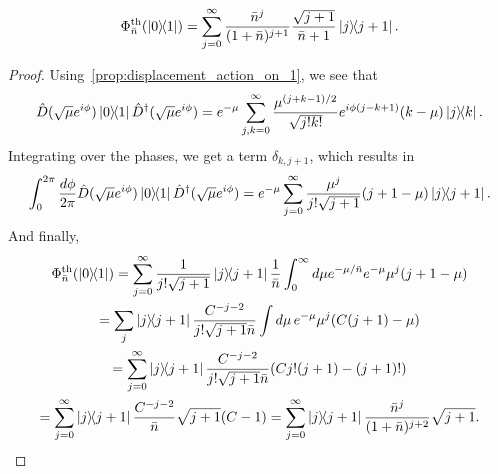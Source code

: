 \documentclass[12pt]{report}
\begin{document}
\begin{prop}\label{prop:thermalisation_applied_to_01}
	\begin{equation}
		\Phi^{\rm th}_{\bar n}(\ketbra{0}{1})
		= \sum_{j=0}^\infty
		\frac{\bar n^{j}}{(1+\bar n)^{j+1}}
		\frac{\sqrt{j+1}}{\bar n + 1}
		\ketbra{j}{j+1}.
	\end{equation}
\end{prop}

\begin{proof}
	Using~\cref{prop:displacement_action_on_1}, we see that
	\begin{equation}
		\hat D(\sqrt\mu e^{i\phi})\ketbra{0}{1} \hat D^\dagger(\sqrt\mu e^{i\phi})
		= e^{-\mu} \sum_{j,k=0}^\infty
		\frac{\mu^{(j+k-1)/2}}{\sqrt{j!k!}}
		e^{i\phi(j-k+1)} (k-\mu) \ketbra{j}{k}.
	\end{equation}
	Integrating over the phases, we get a term $\delta_{k,j+1}$, which results in
	\begin{equation}
		\int_0^{2\pi} \frac{d\phi}{2\pi}
		\hat D(\sqrt\mu e^{i\phi})\ketbra{0}{1} \hat D^\dagger(\sqrt\mu e^{i\phi})
		= e^{-\mu} \sum_{j=0}^\infty
		\frac{\mu^j}{j!\sqrt{j+1}} (j+1-\mu) \ketbra{j}{j+1}.
	\end{equation}
	And finally,
	\begin{equation}
	\begin{gathered}
		\Phi^{\rm th}_{\bar n}(\ketbra{0}{1})
		= \sum_{j=0}^\infty \frac{1}{j!\sqrt{j+1}} \ketbra{j}{j+1} \frac{1}{\bar n}
		\int_0^\infty d\mu
		e^{-\mu/\bar n} e^{-\mu} \mu^j (j+1-\mu) \\
		= \sum_j \ketbra{j}{j+1} \frac{C^{-j-2}}{j!\sqrt{j+1}\bar n}
		\int d\mu \, e^{-\mu} \mu^j (C(j+1) - \mu) \\
		= \sum_{j=0}^\infty \ketbra{j}{j+1} \frac{C^{-j-2}}{j!\sqrt{j+1}\bar n}
		(C j! (j+1) - (j+1)!) \\
		= \sum_{j=0}^\infty \ketbra{j}{j+1} \frac{C^{-j-2}}{\bar n} \sqrt{j+1} (C-1)
		= \sum_{j=0}^\infty \ketbra{j}{j+1}
			\frac{\bar n^{j}}{(1+\bar n)^{j+2}} \sqrt{j+1}.
	\end{gathered}
	\end{equation}
\end{proof}
\end{document}
